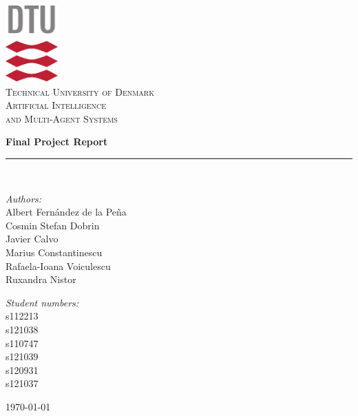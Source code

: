 \documentclass[10pt,oneside]{article}
\begin{document}
 
\begin{titlepage}
\begin{center}
\includegraphics[width=0.15\textwidth]{figures/DTU-logo.pdf}\\[1.3cm]

\textsc{\LARGE Technical University of Denmark}\\[0.8cm]
\textsc{\LARGE Artificial Intelligence \\[0.1cm]and Multi-Agent Systems}

{
 \vspace{1.5cm}
 \huge \bfseries Final Project Report}\\
 \vspace{2.5cm}
 \rule{\linewidth}{0.1mm} \\[0.4cm]
\begin{minipage}{0.4\textwidth}
    \begin{flushleft} \large
	\emph{Authors:}\\
    Albert Fernández de la Peña \\
    Cosmin Stefan Dobrin\\
    Javier Calvo\\
    Marius Constantinescu\\
    Rafaela-Ioana Voiculescu\\
	Ruxandra Nistor
	\end{flushleft}
\end{minipage}
\begin{minipage}{0.4\textwidth}
	\begin{flushright} \large
	\emph{Student numbers:} \\
    s112213\\
    s121038\\
    s110747\\
    s121039\\
	s120931\\
    s121037
	\end{flushright}
\end{minipage}
\vfill
{\large \today}
\end{center}
\end{titlepage}
\end{document}
